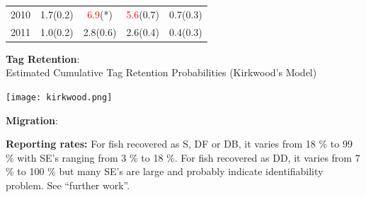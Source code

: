 \documentclass[paperwidth=58in,paperheight=47in,portrait]{baposter}
\begin{document}
\begin{poster}
{\begin{center}
{\begin{tabular}{r|c|c|c|c}
        2010 &   1.7(0.2) &        \textcolor{red}{6.9}(*) &   \textcolor{red}{5.6}(0.7) &   0.7(0.3) \\

        2011 &   1.0(0.2) &   2.8(0.6) &   2.6(0.4) &   0.4(0.3) \\

\end{tabular}}\end{center}

\begin{multicols}{2}    %

\textbf{Tag Retention}: \\
Estimated Cumulative Tag Retention Probabilities (Kirkwood's Model)

\texttt{[image: kirkwood.png]}

\textbf{Migration}:\\


\end{multicols}

\textbf{Reporting rates:} For fish recovered as S, DF or DB, it varies from 18 \% to 99 \% with SE's ranging from 3 \% to 18 \%. For fish recovered as DD, it varies from 7 \% to 100 \% but many SE's are large and probably indicate identifiability problem. See ``further work''.\\

}




\end{poster}
\end{document}

